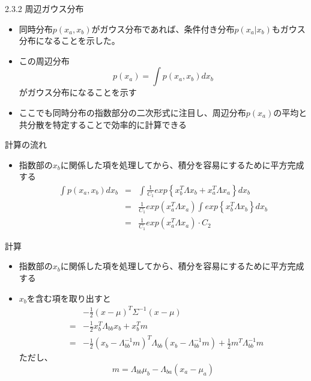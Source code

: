 \begin{frame}{2.3.2 周辺ガウス分布}
 \begin{itemize}
  \item 同時分布$p(x_a,x_b)$がガウス分布であれば、条件付き分布$p(x_a|x_b)$もガウス分布になることを示した。
  \item この周辺分布
        \begin{equation}
         p(x_a) = \int p(x_a,x_b)dx_b
        \end{equation}
        がガウス分布になることを示す
  \item ここでも同時分布の指数部分の二次形式に注目し、周辺分布$p(x_a)$の平均と共分散を特定することで効率的に計算できる
 \end{itemize}
\end{frame}


\begin{frame}{計算の流れ}
 \begin{itemize}
  \item 指数部の$x_b$に関係した項を処理してから、積分を容易にするために平方完成する
        \begin{eqnarray*}
         \int p(x_a,x_b)dx_b &=& \int \frac{1}{C_1}exp\left\{x_b^T\Lambda x_b+x_a^T\Lambda x_a\right\}dx_b \\
         &= &  \frac{1}{C_1}exp(x_a^T\Lambda x_a)\int exp\left\{x_b^T\Lambda x_b\right\}dx_b \\
         & =& \frac{1}{C_1}exp(x_a^T\Lambda x_a)\cdot C_2
        \end{eqnarray*}
 \end{itemize}
\end{frame}


\begin{frame}{計算}
 \begin{itemize}
  \item 指数部の$x_b$に関係した項を処理してから、積分を容易にするために平方完成する
  \item $x_b$を含む項を取り出すと
        \begin{eqnarray*}
         && -\frac{1}{2}(x - \mu)^{T}\Sigma^{-1}(x-\mu) \\
         &=&-\frac{1}{2}x^T_b\Lambda_{bb}x_b+x^T_bm \\
         &=& -\frac{1}{2}(x_b-\Lambda_{bb}^{-1}m)^T\Lambda_{bb}(x_b-\Lambda_{bb}^{-1}m) + \frac{1}{2}m^T\Lambda_{bb}^{-1}m
        \end{eqnarray*}
        ただし、
        \begin{equation*}
         m =  \Lambda_{bb}\mu_b - \Lambda_{ba}(x_a-\mu_a)
        \end{equation*}
 \end{itemize}
\end{frame}

